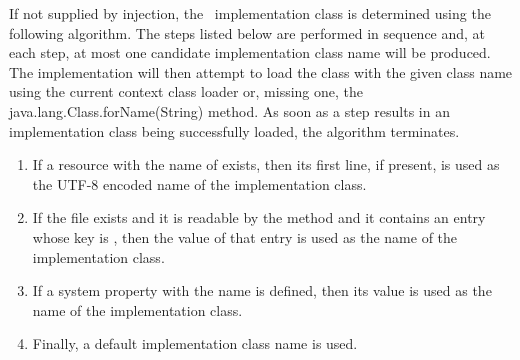 If not supplied by injection, the \rd\ implementation class is determined using the following algorithm. The steps listed below 
are performed in sequence and, at each step, at most one candidate implementation class name will be produced. The implementation will then attempt to load the class with the given class name using the current context class loader or, missing one, the java.lang.Class.forName(String) method. As soon as a step results in an implementation class being successfully loaded, the algorithm terminates.
\begin{enumerate}
\item If a resource with the name of  exists, then its first line, if present, is used as the UTF-8 encoded name of the implementation class. 
\item If the  file exists and it is readable by the  method and it contains an entry whose key is , then the value of that entry is used as the name of the implementation class. 
\item If a system property with the name  is defined, then its value is used as the name of the implementation class. 
\item Finally, a default implementation class name is used. 
\end{enumerate}
